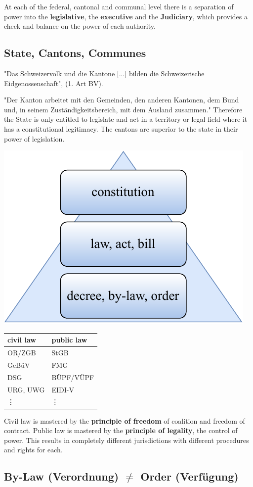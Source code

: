 \documentclass[11pt]{article}
\theoremstyle{definition}
\begin{document}
At each of the federal, cantonal and communal level there is a separation of power into the \textbf{legislative}, the \textbf{executive} and the \textbf{Judiciary}, which provides a check and balance on the power of each authority.

\subsection{State, Cantons, Communes}

"Das Schweizervolk und die Kantone [...] bilden die Schweizerische Eidgenossenschaft", (1. Art BV).

"Der Kanton arbeitet mit den Gemeinden, den anderen Kantonen, dem Bund und, in seinem Zuständigkeitsbereich, mit dem Ausland zusammen." Therefore the State is only entitled to legislate and act in a territory or legal field where it has a constitutional legitimacy. The cantons are superior to the state in their power of legislation.

\begin{center}
	\includegraphics[width=0.4\linewidth,keepaspectratio]{law_hierarchy}
\end{center}

\begin{tabularx}{\linewidth}{X|X}
	\textbf{civil law} & \textbf{public law}\\
	\hline
	OR/ZGB & StGB\\
	GeBüV & FMG\\
	DSG & BÜPF/VÜPF\\
	URG, UWG & EIDI-V\\
	\vdots & \vdots
\end{tabularx}

Civil law is mastered by the \textbf{principle of freedom} of coalition and freedom of contract. Public law is mastered by the \textbf{principle of legality}, the control of power. This results in completely different jurisdictions with different procedures and rights for each.

\subsection{By-Law (Verordnung) $\neq$ Order (Verfügung)}
\end{document}
